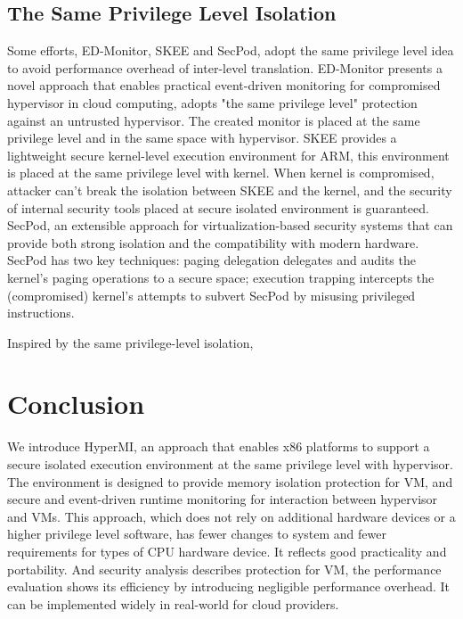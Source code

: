 \documentclass[conference]{IEEEtran}
\begin{document}
\subsection{The Same Privilege Level Isolation}
Some efforts, ED-Monitor\cite{Deng2017Dancing}, SKEE\cite{Azab2016SKEE} and SecPod\cite{Wang2015SecPod}, adopt the same privilege level idea to avoid performance overhead of inter-level translation. ED-Monitor presents a novel approach that enables practical event-driven monitoring for compromised hypervisor in cloud computing, adopts "the same privilege level" protection against an untrusted hypervisor. The created monitor is placed at the same privilege level and in the same space with hypervisor. SKEE provides a lightweight secure kernel-level execution environment for ARM, this environment is placed at the same privilege level with kernel. When kernel is compromised, attacker can't break the isolation between SKEE and the kernel, and the security of internal security tools placed at secure isolated environment is guaranteed. SecPod, an extensible approach for virtualization-based security systems that can provide both strong isolation and the compatibility with modern hardware. SecPod has two key techniques: paging delegation delegates and audits the kernel's paging operations to a secure space; execution trapping intercepts the (compromised) kernel's attempts to subvert SecPod by misusing privileged instructions.

Inspired by the same privilege-level isolation, 

\section{Conclusion}
We introduce HyperMI, an approach that enables x86 platforms to support a secure isolated execution environment at the same privilege level with hypervisor. The environment is designed to provide memory isolation protection for VM, and secure and event-driven runtime monitoring for interaction between hypervisor and VMs. This approach, which does not rely on additional hardware devices or a higher privilege level software, has fewer changes to system and fewer requirements for types of CPU hardware device. It reflects good practicality and portability. And security analysis describes protection for VM, the performance evaluation shows its efficiency by introducing negligible performance overhead. It can be implemented widely in real-world for cloud providers.


 

\end{document}

